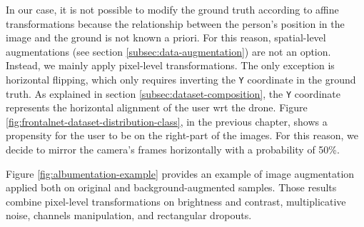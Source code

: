 \medskip

In our case, it is not possible to modify the ground truth according to affine transformations because the relationship between the person's position in the image and the ground is not known a priori. For this reason, spatial-level augmentations (see section \ref{subsec:data-augmentation}) are not an option. Instead, we mainly apply pixel-level transformations. The only exception is horizontal flipping, which only requires inverting the \texttt{Y} coordinate in the ground truth. As explained in section \ref{subsec:dataset-composition}, the \texttt{Y} coordinate represents the horizontal alignment of the user \gls{wrt} the drone. Figure \ref{fig:frontalnet-dataset-distribution-class}, in the previous chapter, shows a propensity for the user to be on the right-part of the images. For this reason, we decide to mirror the camera's frames horizontally with a probability of 50\%.

Figure \ref{fig:albumentation-example} provides an example of image augmentation applied both on original and background-augmented samples. Those results combine pixel-level transformations on brightness and contrast, multiplicative noise, channels manipulation, and rectangular dropouts.

